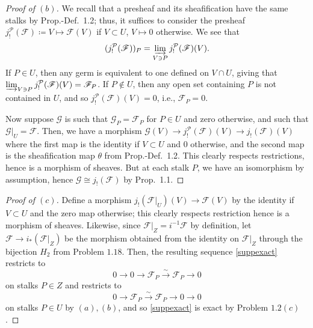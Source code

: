 \documentclass[12pt,letterpaper]{article}
\theoremstyle{definition}
\theoremstyle{remark}
\numberwithin{equation}{section}
\numberwithin{figure}{problem}
\newcommand{\isoto}{\overset{\sim}{\to}}%
\begin{document}
\begin{proof}[Proof of $(b)$]
  We recall that a presheaf and its sheafification have the same stalks by Prop.-Def.~1.2; thus, it suffices to consider the presheaf $j_!^\mathcal{P}(\mathscr{F}) \coloneqq V \mapsto \mathscr{F}(V)$ if $V \subset U$, $V \mapsto 0$ otherwise. We see that
  \begin{equation*}
    (j_!^\mathcal{P}(\mathscr{F}))_P = \varinjlim_{V \ni P} j_!^\mathcal{P}(\mathscr{F})(V).
  \end{equation*}
  If $P \in U$, then any germ is equivalent to one defined on $V \cap U$, giving that $\varinjlim_{V \ni P} j_!^\mathcal{P}(\mathscr{F})(V) = \mathscr{F}_P$. If $P \notin U$, then any open set containing $P$ is not contained in $U$, and so $j_!^\mathcal{P}(\mathscr{F})(V) = 0$, i.e., $\mathscr{F}_P = 0$.
  \par Now suppose $\mathscr{G}$ is such that $\mathscr{G}_P = \mathscr{F}_P$ for $P \in U$ and zero otherwise, and such that $\mathscr{G}\vert_U = \mathscr{F}$. Then, we have a morphism $\mathscr{G}(V) \to j_!^\mathcal{P}(\mathscr{F})(V) \to j_!(\mathscr{F})(V)$ where the first map is the identity if $V \subset U$ and $0$ otherwise, and the second map is the sheafification map $\theta$ from Prop.-Def.~1.2. This clearly respects restrictions, hence is a morphism of sheaves. But at each stalk $P$, we have an isomorphism by assumption, hence $\mathscr{G} \cong j_!(\mathscr{F})$ by Prop.~1.1.
\end{proof}
\begin{proof}[Proof of $(c)$]
  Define a morphism $j_!(\mathscr{F}\vert_U)(V) \to \mathscr{F}(V)$ by the identity if $V \subset U$ and the zero map otherwise; this clearly respects restriction hence is a morphism of sheaves. Likewise, since $\mathscr{F}\vert_Z = i^{-1}\mathscr{F}$ by definition, let $\mathscr{F} \to i_*(\mathscr{F}\vert_Z)$ be the morphism obtained from the identity on $\mathscr{F}\vert_Z$ through the bijection $H_2$ from Problem $1.18$. Then, the resulting sequence \eqref{suppexact} restricts to
  \begin{equation*}
    0 \to 0 \to \mathscr{F}_P \isoto \mathscr{F}_P \to 0
  \end{equation*}
  on stalks $P \in Z$ and restricts to
  \begin{equation*}
    0 \to \mathscr{F}_P \isoto \mathscr{F}_P \to 0 \to 0
  \end{equation*}
  on stalks $P \in U$ by $(a),(b)$, and so \eqref{suppexact} is exact by Problem $1.2(c)$.
\end{proof}
\end{document}
